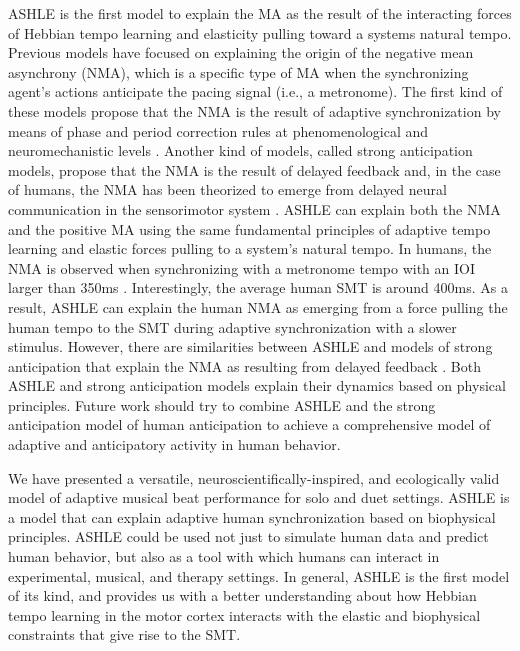 \documentclass{report}
\begin{document}
ASHLE is the first model to explain the MA as the result of the interacting forces of Hebbian tempo learning and elasticity pulling toward a systems natural tempo. Previous models have focused on explaining the origin of the negative mean asynchrony (NMA), which is a specific type of MA when the synchronizing agent's actions anticipate the pacing signal (i.e., a metronome). The first kind of these models propose that the NMA is the result of adaptive synchronization by means of phase and period correction rules at phenomenological \cite{van2013adaptation} and neuromechanistic levels \cite{bose2019neuromechanistic}. Another kind of models, called strong anticipation models, propose that the NMA is the result of delayed feedback \cite{stepp2010strong} and, in the case of humans, the NMA has been theorized to emerge from delayed neural communication in the sensorimotor system \cite{roman2019delayed}. ASHLE can explain both the NMA and the positive MA using the same fundamental principles of adaptive tempo learning and elastic forces pulling to a system's natural tempo. In humans, the NMA is observed when synchronizing with a metronome tempo with an IOI larger than 350ms \cite{mates1994temporal}. Interestingly, the average human SMT is around 400ms. As a result, ASHLE can explain the human NMA as emerging from a force pulling the human tempo to the SMT during adaptive synchronization with a slower stimulus. However, there are similarities between ASHLE and models of strong anticipation that explain the NMA as resulting from delayed feedback \cite{stepp2010strong, roman2019delayed}. Both ASHLE and strong anticipation models explain their dynamics based on physical principles. Future work should try to combine ASHLE and the strong anticipation model of human anticipation to achieve a comprehensive model of adaptive and anticipatory activity in human behavior.

We have presented a versatile, neuroscientifically-inspired, and ecologically valid model of adaptive musical beat performance for solo and duet settings. ASHLE is a model that can explain adaptive human synchronization based on biophysical principles. ASHLE could be used not just to simulate human data and predict human behavior, but also as a tool with which humans can interact in experimental, musical, and therapy settings. In general, ASHLE is the first model of its kind, and provides us with a better understanding about how Hebbian tempo learning in the motor cortex interacts with the elastic and biophysical constraints that give rise to the SMT.
\end{document}
